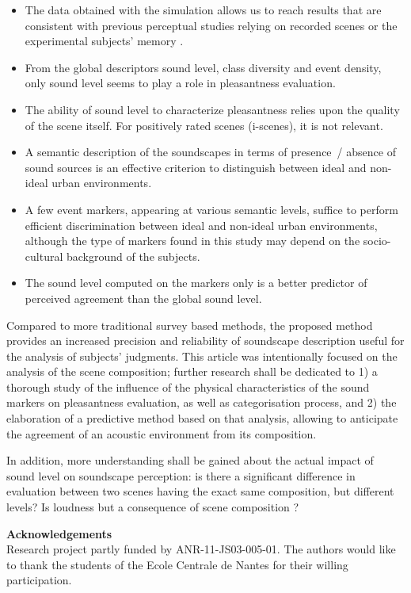\documentclass[twoside,twocolumn]{article}
\begin{document}
\begin{itemize}
\item The data obtained with the simulation allows us to reach results that are consistent with previous perceptual studies relying on recorded scenes \cite{lavandier2006contribution} or the experimental subjects' memory \cite{guastavino_ideal_2006}.
\item From the global descriptors sound level, class diversity and event density, only sound level seems to play a role in pleasantness evaluation.
\item The ability of sound level to characterize pleasantness relies upon the quality of the scene itself. For positively rated scenes (i-scenes), it is not relevant.
\item A semantic description of the soundscapes in terms of presence~/ absence of sound sources is an effective criterion to distinguish between ideal and non-ideal urban environments.
\item A few event markers, appearing at various semantic levels, suffice to perform efficient discrimination between ideal and non-ideal urban environments, although the type of markers found in this study may depend on the socio-cultural background of the subjects. 
\item The sound level computed on the markers only is a better predictor of perceived agreement than the global sound level.
\end{itemize}

Compared to more traditional survey based methods, the proposed method provides an increased precision and reliability of soundscape description useful for the analysis of subjects' judgments. This article was intentionally focused on the analysis of the scene composition; further research shall be dedicated to 1) a thorough study of the influence of the physical characteristics of the sound markers on pleasantness evaluation, as well as categorisation process, and 2) the elaboration of a predictive method based on that analysis, allowing to anticipate the agreement of an acoustic environment from its composition.

In addition, more understanding shall be gained about the actual impact of sound level on soundscape perception: is there a significant difference in evaluation between two scenes having the exact same composition, but different levels? Is loudness but a consequence of scene composition ?

\noindent \textbf{Acknowledgements}\\
\setlength{\parindent}{0.7cm} 
Research project partly funded by ANR-11-JS03-005-01. The authors would like to thank the students of the Ecole Centrale de Nantes for their willing participation.



\end{document}
